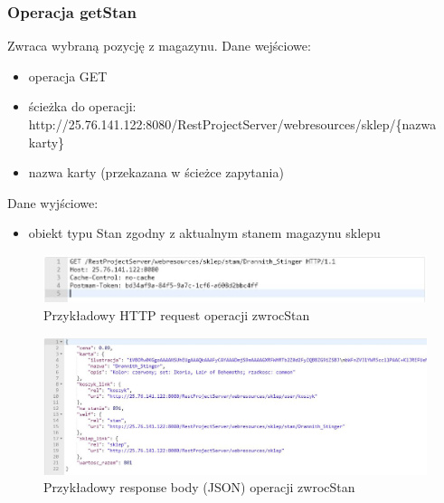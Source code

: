 \documentclass[11pt]{article}   %
\begin{document}
\subsubsection{Operacja getStan}
Zwraca wybraną pozycję z magazynu.
Dane wejściowe:
\begin{itemize}
	\item operacja GET
	\item ścieżka do operacji: \newline http://25.76.141.122:8080/RestProjectServer/webresources/sklep/\{nazwa karty\}
	\item nazwa karty (przekazana w ścieżce zapytania)
\end{itemize}	
Dane wyjściowe:
\begin{itemize}
	\item obiekt typu Stan zgodny z aktualnym stanem magazynu sklepu
	
\end{itemize}
\begin{figure}[H]
	\centering
	\includegraphics[width=0.8\linewidth]{komunikaty_zdjecia_rest/getStan_req}
	\caption{Przykładowy HTTP request operacji zwrocStan}
	\label{zrzut31}
\end{figure}
\begin{figure}[H]
	\centering
	\includegraphics[width=0.8\linewidth]{komunikaty_zdjecia_rest/getStan_res_body}
	\caption{Przykładowy response body (JSON) operacji zwrocStan}
	\label{zrzut32}
\end{figure}
\end{document}
